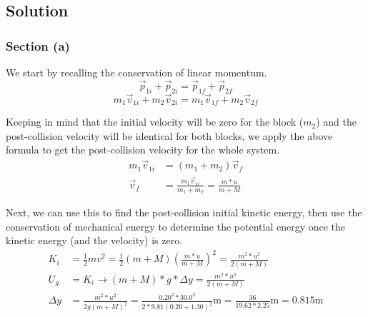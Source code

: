 \documentclass[12pt]{article}
\begin{document}
\subsection*{Solution}
\subsubsection*{Section (a)}
We start by recalling the conservation of linear momentum.
\[ \vec{p}_{1i} + \vec{p}_{2i} = \vec{p}_{1f} + \vec{p}_{2f} \]
\[ m_1\vec{v}_{1i} + m_2\vec{v}_{2i} = m_1\vec{v}_{1f} + m_2\vec{v}_{2f} \]

Keeping in mind that the initial velocity will be zero for the block ($m_2$) and the post-collision velocity will be identical for both blocks, we apply the above formula to get the post-collision velocity for the whole system.
\begin{align*}
    m_1\vec{v}_{1i} &=  (m_1 + m_2)\vec{v}_{f}\\
    \vec{v}_{f} &=  \frac{m_1\vec{v}_{1i}}{m_1 + m_2} = \frac{m*u}{m+M}
\end{align*}

Next, we can use this to find the post-collision initial kinetic energy, then use the conservation of mechanical energy to determine the potential energy once the kinetic energy (and the velocity) is zero.
\begin{align*}
    K_i &=  \frac{1}{2}mv^2
        =   \frac{1}{2}(m+M)\left(\frac{m*u}{m+M}\right)^2
        =   \frac{m^2*u^2}{2(m+M)}\\
    U_g &=  K_i\rightarrow
    (m+M)*g*\Delta y    =  \frac{m^2*u^2}{2(m+M)}\\
    \Delta y    &=  \frac{m^2*u^2}{2g(m+M)^2}
        =   \frac{0.20^2*30.0^2}{2*9.81(0.20+1.30)^2}\unit{\meter}
        =   \frac{36}{19.62*2.25}\unit{\meter}
        =   \boxed{0.815\unit{\meter}}
\end{align*}

\pagebreak
\end{document}
